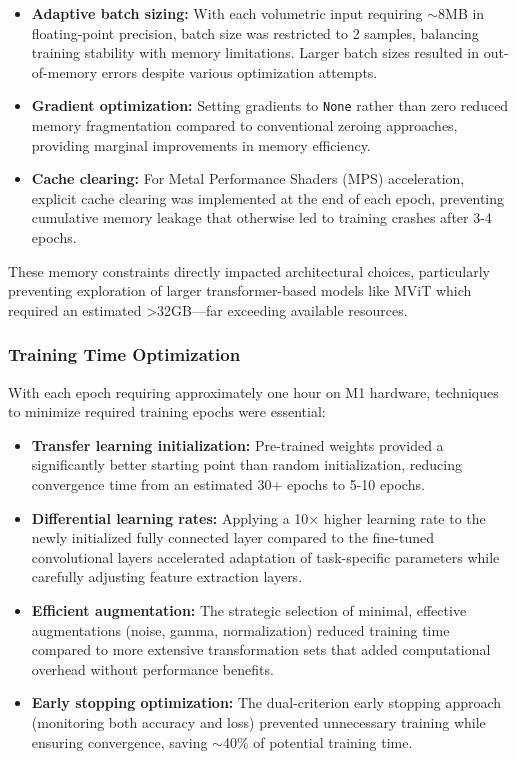 \documentclass[12pt, a4paper]{article}
\begin{document}
\begin{itemize}
    \item \textbf{Adaptive batch sizing:} With each volumetric input requiring $\sim$8MB in floating-point precision, batch size was restricted to 2 samples, balancing training stability with memory limitations. Larger batch sizes resulted in out-of-memory errors despite various optimization attempts.
    
    \item \textbf{Gradient optimization:} Setting gradients to \texttt{None} rather than zero reduced memory fragmentation compared to conventional zeroing approaches, providing marginal improvements in memory efficiency.
    
    \item \textbf{Cache clearing:} For Metal Performance Shaders (MPS) acceleration, explicit cache clearing was implemented at the end of each epoch, preventing cumulative memory leakage that otherwise led to training crashes after 3-4 epochs.
\end{itemize}

These memory constraints directly impacted architectural choices, particularly preventing exploration of larger transformer-based models like MViT which required an estimated >32GB—far exceeding available resources.

\subsubsection{Training Time Optimization}

With each epoch requiring approximately one hour on M1 hardware, techniques to minimize required training epochs were essential:

\begin{itemize}
    \item \textbf{Transfer learning initialization:} Pre-trained weights provided a significantly better starting point than random initialization, reducing convergence time from an estimated 30+ epochs to 5-10 epochs.
    
    \item \textbf{Differential learning rates:} Applying a 10× higher learning rate to the newly initialized fully connected layer compared to the fine-tuned convolutional layers accelerated adaptation of task-specific parameters while carefully adjusting feature extraction layers.
    
    \item \textbf{Efficient augmentation:} The strategic selection of minimal, effective augmentations (noise, gamma, normalization) reduced training time compared to more extensive transformation sets that added computational overhead without performance benefits.
    
    \item \textbf{Early stopping optimization:} The dual-criterion early stopping approach (monitoring both accuracy and loss) prevented unnecessary training while ensuring convergence, saving $\sim$40\% of potential training time.
\end{itemize}
\end{document}
